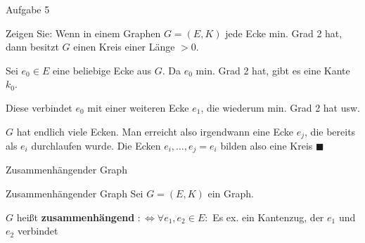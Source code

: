 \begin{frame}{Aufgabe 5}
\begin{block}{Zeigen Sie: }
Wenn in einem Graphen $G=(E,K)$ jede Ecke min. Grad 2 hat, dann
besitzt $G$ einen Kreis einer Länge $>0$.
\end{block}

\pause

Sei $e_0 \in E$ eine beliebige Ecke aus $G$. Da $e_0$ min. Grad 2 hat,
gibt es eine Kante $k_0$.

\pause

Diese verbindet $e_0$ mit einer weiteren Ecke $e_1$, die wiederum
min. Grad 2 hat usw.

\pause

$G$ hat endlich viele Ecken. Man erreicht also irgendwann eine
Ecke $e_j$, die bereits als $e_i$ durchlaufen wurde. Die Ecken
$e_i, \dots, e_j = e_i$ bilden also eine Kreis $\blacksquare$
\end{frame}

\begin{frame}{Zusammenhängender Graph}
\begin{block}{Zusammenhängender Graph}
Sei $G = (E, K)$ ein Graph.

$G$ heißt \textbf{zusammenhängend} $:\Leftrightarrow \forall e_1, e_2 \in E: $
Es ex. ein Kantenzug, der $e_1$ und $e_2$ verbindet
\end{block}

\begin{gallery}
    \\
\end{gallery}
\end{frame}
